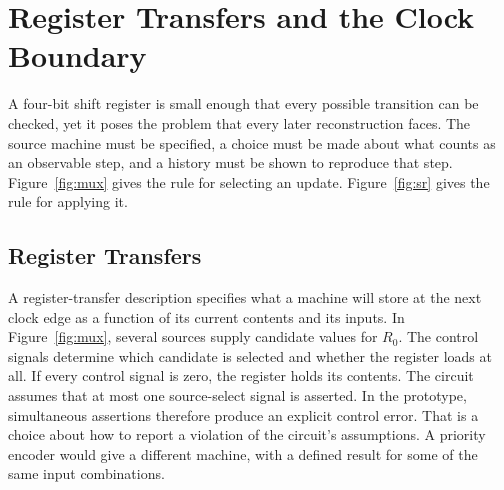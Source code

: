 \chapter{Register Transfers and the Clock Boundary}

A four-bit shift register is small enough that every possible transition can be checked, yet it poses the problem that every later reconstruction faces. The source machine must be specified, a choice must be made about what counts as an observable step, and a \SP{} history must be shown to reproduce that step. Figure~\ref{fig:mux} gives the rule for selecting an update. Figure~\ref{fig:sr} gives the rule for applying it.

\section{Register Transfers}

A register-transfer description specifies what a machine will store at the next clock edge as a function of its current contents and its inputs. In Figure~\ref{fig:mux}, several sources supply candidate values for $R_0$. The control signals determine which candidate is selected and whether the register loads at all. If every control signal is zero, the register holds its contents. The circuit assumes that at most one source-select signal is asserted. In the prototype, simultaneous assertions therefore produce an explicit control error. That is a choice about how to report a violation of the circuit's assumptions. A priority encoder would give a different machine, with a defined result for some of the same input combinations.


